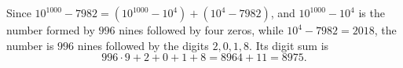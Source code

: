 Since $10^{1000}-7982=\left(10^{1000}-10^4\right)+\left(10^4-7982\right)$, and $10^{1000}-10^4$ is the number formed by $996$ nines followed by four zeros, while $10^4-7982=2018$, the number is $996$ nines followed by the digits $2,0,1,8$. Its digit sum is
\[
996\cdot9+2+0+1+8=8964+11=\boxed{8975}.
\]
